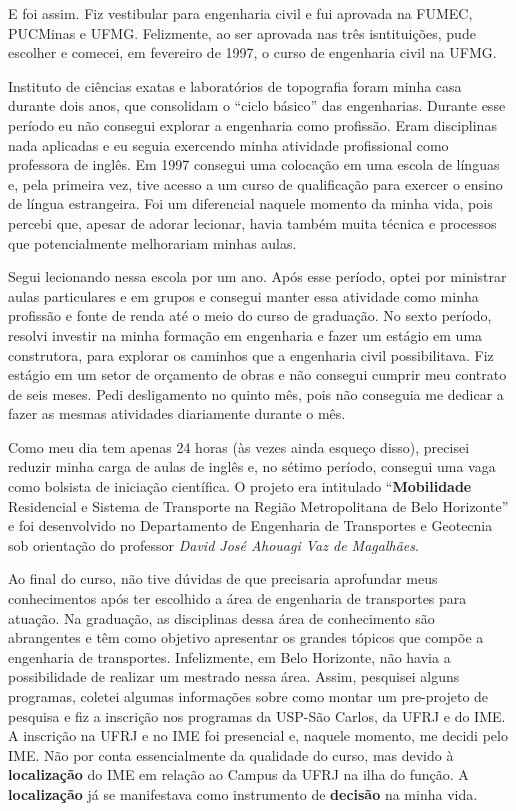 \documentclass[
]{book}
\begin{document}
E foi assim. Fiz vestibular para engenharia civil e fui aprovada na
FUMEC, PUCMinas e UFMG. Felizmente, ao ser aprovada nas três
isntituições, pude escolher e comecei, em fevereiro de 1997, o curso de
engenharia civil na UFMG.

Instituto de ciências exatas e laboratórios de topografia foram minha
casa durante dois anos, que consolidam o ``ciclo básico'' das
engenharias. Durante esse período eu não consegui explorar a engenharia
como profissão. Eram disciplinas nada aplicadas e eu seguia exercendo
minha atividade profissional como professora de inglês. Em 1997 consegui
uma colocação em uma escola de línguas e, pela primeira vez, tive acesso
a um curso de qualificação para exercer o ensino de língua estrangeira.
Foi um diferencial naquele momento da minha vida, pois percebi que,
apesar de adorar lecionar, havia também muita técnica e processos que
potencialmente melhorariam minhas aulas.

Segui lecionando nessa escola por um ano. Após esse período, optei por
ministrar aulas particulares e em grupos e consegui manter essa
atividade como minha profissão e fonte de renda até o meio do curso de
graduação. No sexto período, resolvi investir na minha formação em
engenharia e fazer um estágio em uma construtora, para explorar os
caminhos que a engenharia civil possibilitava. Fiz estágio em um setor
de orçamento de obras e não consegui cumprir meu contrato de seis meses.
Pedi desligamento no quinto mês, pois não conseguia me dedicar a fazer
as mesmas atividades diariamente durante o mês.

Como meu dia tem apenas 24 horas (às vezes ainda esqueço disso),
precisei reduzir minha carga de aulas de inglês e, no sétimo período,
consegui uma vaga como bolsista de iniciação científica. O projeto era
intitulado ``\textbf{Mobilidade} Residencial e Sistema de Transporte na
Região Metropolitana de Belo Horizonte'' e foi desenvolvido no
Departamento de Engenharia de Transportes e Geotecnia sob orientação do
professor \emph{David José Ahouagi Vaz de Magalhães}.

Ao final do curso, não tive dúvidas de que precisaria aprofundar meus
conhecimentos após ter escolhido a área de engenharia de transportes
para atuação. Na graduação, as disciplinas dessa área de conhecimento
são abrangentes e têm como objetivo apresentar os grandes tópicos que
compõe a engenharia de transportes. Infelizmente, em Belo Horizonte, não
havia a possibilidade de realizar um mestrado nessa área. Assim,
pesquisei alguns programas, coletei algumas informações sobre como
montar um pre-projeto de pesquisa e fiz a inscrição nos programas da
USP-São Carlos, da UFRJ e do IME. A inscrição na UFRJ e no IME foi
presencial e, naquele momento, me decidi pelo IME. Não por conta
essencialmente da qualidade do curso, mas devido à \textbf{localização}
do IME em relação ao Campus da UFRJ na ilha do função. A
\textbf{localização} já se manifestava como instrumento de
\textbf{decisão} na minha vida.
\end{document}
